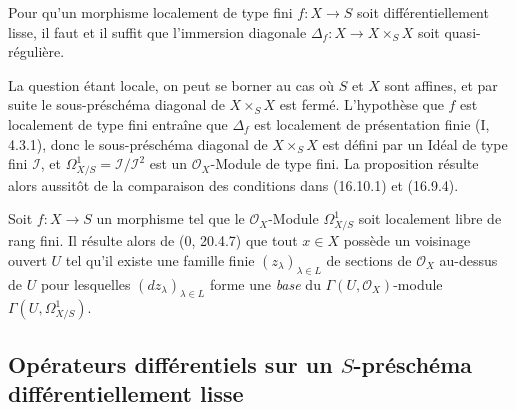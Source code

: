 \begin{proposition}[16.10.5]
\label{IV.16.10.5}
Pour qu'un morphisme localement de type fini $f:X\to S$ soit
différentiellement lisse, il faut et il suffit que l'immersion diagonale
$\Delta_f:X\to X\times_S X$ soit quasi-régulière.
\end{proposition}


La question étant locale, on peut se borner au cas où $S$ et $X$ sont
affines, et par suite le sous-préschéma diagonal de $X\times_S X$ est fermé.
L'hypothèse que $f$ est localement de type fini entraîne que $\Delta_f$ est
localement de présentation finie (I, 4.3.1), donc le sous-préschéma diagonal
de $X\times_S X$ est défini par un Idéal de type fini $\mathscr{I}$, et
$\Omega_{X/S}^1=\mathscr{I}/\mathscr{I}^2$ est un $\mathcal{O}_X$-Module de
type fini. La proposition résulte alors aussitôt de la comparaison des
conditions dans (16.10.1) et (16.9.4).

\begin{remark}[16.10.6]
\label{IV.16.10.6}
Soit $f:X\to S$ un morphisme tel que le $\mathcal{O}_X$-Module
$\Omega_{X/S}^1$ soit localement libre de rang fini. Il résulte alors de
(0, 20.4.7) que tout $x\in X$ possède un voisinage ouvert $U$ tel qu'il existe
une famille finie $(z_\lambda)_{\lambda\in L}$ de sections de
$\mathcal{O}_X$ au-dessus de $U$ pour lesquelles $(dz_\lambda)_{\lambda\in L}$
forme une \emph{base} du $\Gamma(U,\mathcal{O}_X)$-module
$\Gamma(U,\Omega_{X/S}^1)$.
\end{remark}

\subsection{\texorpdfstring{Opérateurs différentiels sur un $S$-préschéma différentiellement
lisse}{Opérateurs différentiels sur un S-préschéma différentiellement lisse}}

